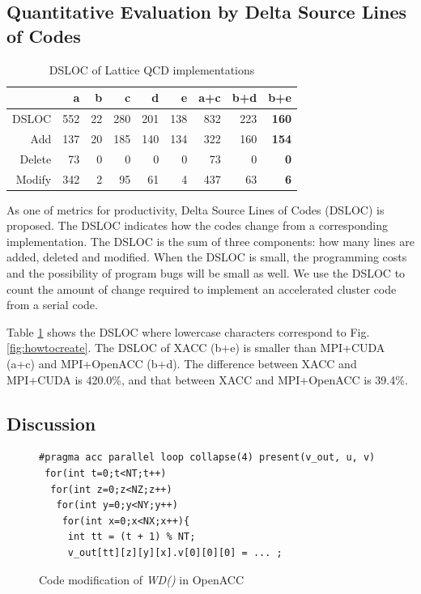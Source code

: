 \subsection{Quantitative Evaluation by Delta Source Lines of Codes}
\begin{table}[h]
\renewcommand{\arraystretch}{1.2}
\centering
\caption{DSLOC of Lattice QCD implementations} \label{tab:dsloc}
\begin{tabular}[h]{r|rrrrr|rrr} \hline
       & a   & b  & c   & d   & e   & a+c & b+d & {\bf b+e}  \\ \hline
DSLOC  & 552 & 22 & 280 & 201 & 138 & 832 & 223 & {\bf 160} \\  \hline
Add    & 137 & 20 & 185 & 140 & 134 & 322 & 160 & {\bf 154} \\
Delete & 73 & 0 & 0 & 0 & 0 & 73 & 0 & {\bf 0} \\
Modify & 342 & 2 & 95 & 61 & 4 & 437 & 63 & {\bf 6} \\ \hline
\end{tabular}
\end{table}

As one of metrics for productivity,
Delta Source Lines of Codes (DSLOC) is proposed\cite{CGPOP2011}.
The DSLOC indicates how the codes change from a corresponding implementation.
The DSLOC is the sum of three components: how many lines are added, deleted and modified.
When the DSLOC is small,
the programming costs and the possibility of program bugs will be small as well.
We use the DSLOC to count the amount of change required to implement an accelerated cluster code from a serial code.

Table \ref{tab:dsloc} shows the DSLOC where lowercase characters correspond to Fig. \ref{fig:howtocreate}.
The DSLOC of XACC (b+e) is smaller than MPI+CUDA (a+c) and MPI+OpenACC (b+d).
The difference between XACC and MPI+CUDA is 420.0\%, and that between XACC and MPI+OpenACC is 39.4\%.

\subsection{Discussion}\label{sec:pro-con}
\begin{figure}[h]
\centering
\begin{lstlisting}
#pragma acc parallel loop collapse(4) present(v_out, u, v)
 for(int t=0;t<NT;t++)
  for(int z=0;z<NZ;z++)
   for(int y=0;y<NY;y++)
    for(int x=0;x<NX;x++){
     int tt = (t + 1) % NT;
     v_out[tt][z][y][x].v[0][0][0] = ... ;
\end{lstlisting}\vspace{-1.5ex}
\caption{Code modification of {\it WD()} in OpenACC}\label{fig:modification-openacc}
\end{figure}

